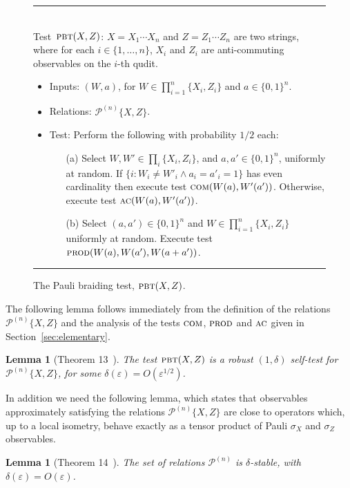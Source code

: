 \documentclass[11pt]{article}
\newtheorem{lemma}[theorem]{Lemma}
\theoremstyle{remark}
\theoremstyle{definition}
\newcommand{\eps}{\varepsilon}
\newcommand{\pbt}{\textsc{pbt}}
\newcommand{\prodt}{\textsc{prod}}
\newcommand{\comt}{\textsc{com}}
\newcommand{\act}{\textsc{ac}}
\newcommand{\paulin}{\mathcal{P}^{(n)}\!}
\begin{document}
\begin{figure}[H]
\rule[1ex]{\textwidth}{0.5pt}\\
Test~$\pbt(X,Z)$: $X=X_1\cdots X_n$ and $Z=Z_1\cdots Z_n$ are two strings, where for each $i\in\{1,\ldots,n\}$, $X_i$ and $Z_i$ are anti-commuting observables on the $i$-th qudit. 
\begin{itemize}
\item Inputs: $(W,a)$, for $W\in\prod_{i=1}^n\{X_i,Z_i\}$ and $a\in\{0,1\}^n$.
\item Relations: $\paulin\{X,Z\}$.  
\item Test: Perform the following with probability $1/2$ each: 
\begin{enumerate}
\item[(a)] Select $W,W'\in \prod_i \{X_i,Z_i\}$, and $a,a'\in\{0,1\}^n$, uniformly at random. If $\{i: W_i\neq W'_i \wedge a_i=a'_i=1\}$ has even cardinality then execute test $\comt(W(a),W'(a'))$. Otherwise, execute test $\act(W(a),W'(a'))$. 
\item[(b)] Select $(a,a')\in\{0,1\}^n$ and $W\in\prod_{i=1}^n\{X_i,Z_i\}$ uniformly at random. Execute test $\prodt(W(a),W(a'),W(a+a'))$. 
\end{enumerate}
\end{itemize}
\rule[2ex]{\textwidth}{0.5pt}\vspace{-1cm}
\caption{The Pauli braiding test, $\pbt(X,Z)$.}
\label{fig:pbt}
\end{figure}

The following lemma follows immediately from the definition of the relations  $\paulin\{X,Z\}$ and the analysis of the tests $\comt$, $\prodt$ and $\act$ given in Section~\ref{sec:elementary}. 


\begin{lemma}[Theorem 13~\cite{natarajan2016robust}]\label{lem:pbt}
The test $\pbt(X,Z)$ is a robust $(1,\delta)$ self-test 
for $\paulin\{X,Z\}$, for some $\delta(\eps) = O(\eps^{1/2})$. 
\end{lemma}

In addition we need the following lemma, which states that observables approximately satisfying the relations $\paulin\{X,Z\}$ are close to operators which, up to a local isometry, behave exactly as a tensor product of Pauli $\sigma_X$ and $\sigma_Z$ observables. 


\begin{lemma}[Theorem 14~\cite{natarajan2016robust}]\label{lem:pauli-stable}
The set of relations $\mathcal{P}^{(n)}$ is $\delta$-stable, with $\delta(\eps) = O(\eps)$.
\end{lemma}
\end{document}
